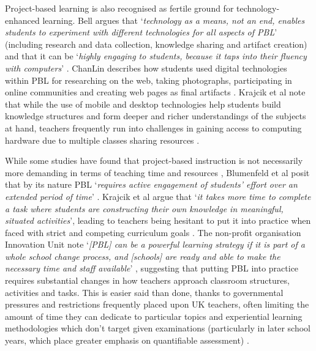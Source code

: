 \documentclass[,hyphens]{sigchi}
\begin{document}
Project-based learning is also recognised as fertile ground for technology-enhanced learning. Bell argues that `\textit{technology as a means, not an end, enables students to experiment with different technologies for all aspects of PBL}' (including research and data collection, knowledge sharing and artifact creation) and that it can be `\textit{highly engaging to students, because it taps into their fluency with computers}' \cite{Bell2010}. ChanLin describes how students used digital technologies within PBL for researching on the web, taking photographs, participating in online communities and creating web pages as final artifacts \cite{ChanLin2008}. Krajcik et al note that while the use of mobile and desktop technologies help students build knowledge structures and form deeper and richer understandings of the subjects at hand, teachers frequently run into challenges in gaining access to computing hardware due to multiple classes sharing resources \cite{Krajcik2006}.

While some studies have found that project-based instruction is not necessarily more demanding in terms of teaching time and resources \cite{Al-Balushi2014}, Blumenfeld et al posit that by its nature PBL `\textit{requires active engagement of students' effort over an extended period of time}' \cite{Blumenfeld1991}. Krajcik et al argue that `\textit{it takes more time to complete a task where students are constructing their own knowledge in meaningful, situated activities}', leading to teachers being hesitant to put it into practice when faced with strict and competing curriculum goals \cite{Krajcik2006}. The non-profit organisation Innovation Unit note `\textit{[PBL] can be a powerful learning strategy if it is part of a whole school change process, and [schools] are ready and able to make the necessary time and staff available}' \cite{InnovationUnit2016}, suggesting that putting PBL into practice requires substantial changes in how teachers approach classroom structures, activities and tasks. This is easier said than done, thanks to governmental pressures and restrictions frequently placed upon UK teachers, often limiting the amount of time they can dedicate to particular topics and experiential learning methodologies which don't target given examinations (particularly in later school years, which place greater emphasis on quantifiable assessment) \cite{Ofsted2018}.
\end{document}
